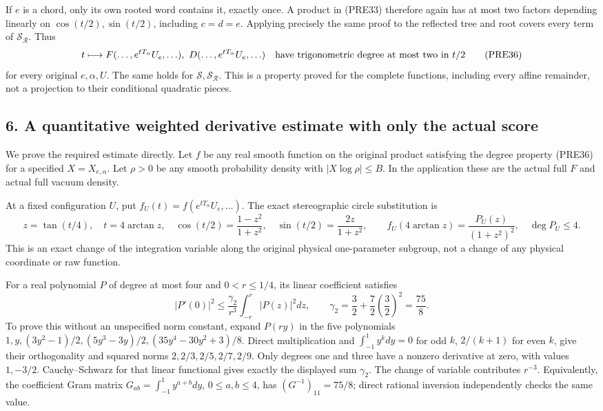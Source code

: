 \documentclass[11pt]{article}
\begin{document}
If \(e\) is a chord, only its own rooted word contains it, exactly once. A product in (PRE33) therefore again has at most two factors depending linearly on \(\cos(t/2),\sin(t/2)\), including \(c=d=e\). Applying precisely the same proof to the reflected tree and root covers every term of \(\mathcal S_{\mathcal R}\). Thus
\[
 t\longmapsto F(\ldots,e^{tT_\alpha}U_e,\ldots),\
 D(\ldots,e^{tT_\alpha}U_e,\ldots)
 \quad\hbox{have trigonometric degree at most two in }t/2
 \tag{PRE36}
\]
for every original \(e,\alpha,U\). The same holds for \(\mathcal S,\mathcal S_{\mathcal R}\). This is a property proved for the complete functions, including every affine remainder, not a projection to their conditional quadratic pieces.

\subsection*{6. A quantitative weighted derivative estimate with only the actual score}

We prove the required estimate directly. Let \(f\) be any real smooth function on the original product satisfying the degree property (PRE36) for a specified \(X=X_{e,\alpha}\). Let \(\rho>0\) be any smooth probability density with \(|X\log\rho|\le B\). In the application these are the actual full \(F\) and actual full vacuum density.

At a fixed configuration \(U\), put \(f_U(t)=f(e^{tT_\alpha}U_e,\ldots)\). The exact stereographic circle substitution is
\[
 z=\tan(t/4),\quad t=4\arctan z,\quad
 \cos(t/2)=\frac{1-z^2}{1+z^2},\quad
 \sin(t/2)=\frac{2z}{1+z^2},\qquad
 f_U(4\arctan z)=\frac{P_U(z)}{(1+z^2)^2},
 \quad \deg P_U\le4.
 \tag{PRE37}
\]
This is an exact change of the integration variable along the original physical one-parameter subgroup, not a change of any physical coordinate or raw function.

For a real polynomial \(P\) of degree at most four and \(0<r\le1/4\), its linear coefficient satisfies
\[
 |P'(0)|^2\le\frac{\gamma_2}{r^3}\int_{-r}^r|P(z)|^2dz,
 \qquad
 \gamma_2=\frac32+\frac72\left(\frac32\right)^2=\frac{75}{8}.
 \tag{PRE38}
\]
To prove this without an unspecified norm constant, expand \(P(ry)\) in the five polynomials \(1,y,(3y^2-1)/2,(5y^3-3y)/2,(35y^4-30y^2+3)/8\). Direct multiplication and \(\int_{-1}^1y^kdy=0\) for odd \(k\), \(2/(k+1)\) for even \(k\), give their orthogonality and squared norms \(2,2/3,2/5,2/7,2/9\). Only degrees one and three have a nonzero derivative at zero, with values \(1,-3/2\). Cauchy–Schwarz for that linear functional gives exactly the displayed sum \(\gamma_2\). The change of variable contributes \(r^{-3}\). Equivalently, the coefficient Gram matrix \(G_{ab}=\int_{-1}^1y^{a+b}dy\), \(0\le a,b\le4\), has \((G^{-1})_{11}=75/8\); direct rational inversion independently checks the same value.
\end{document}
